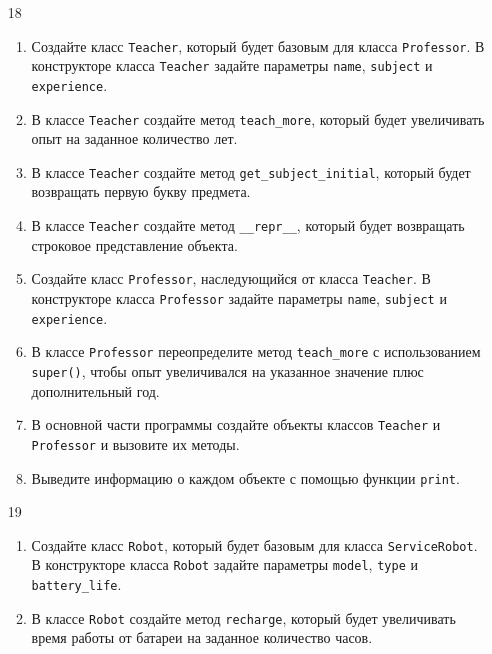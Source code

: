 \begin{enumerate}
\item[18] 
\begin{enumerate}
    \item Создайте класс \texttt{Teacher}, который будет базовым для класса \texttt{Professor}. В конструкторе класса \texttt{Teacher} задайте параметры \texttt{name}, \texttt{subject} и \texttt{experience}.
    
    \item В классе \texttt{Teacher} создайте метод \texttt{teach\_more}, который будет увеличивать опыт на заданное количество лет.
    
    \item В классе \texttt{Teacher} создайте метод \texttt{get\_subject\_initial}, который будет возвращать первую букву предмета.
    
    \item В классе \texttt{Teacher} создайте метод \texttt{\_\_repr\_\_}, который будет возвращать строковое представление объекта.
    
    \item Создайте класс \texttt{Professor}, наследующийся от класса \texttt{Teacher}. В конструкторе класса \texttt{Professor} задайте параметры \texttt{name}, \texttt{subject} и \texttt{experience}.
    
    \item В классе \texttt{Professor} переопределите метод \texttt{teach\_more} с использованием \texttt{super()}, чтобы опыт увеличивался на указанное значение плюс дополнительный год.
    
    \item В основной части программы создайте объекты классов \texttt{Teacher} и \texttt{Professor} и вызовите их методы.
    
    \item Выведите информацию о каждом объекте с помощью функции \texttt{print}.
\end{enumerate}

\item[19] 
\begin{enumerate}
    \item Создайте класс \texttt{Robot}, который будет базовым для класса \texttt{ServiceRobot}. В конструкторе класса \texttt{Robot} задайте параметры \texttt{model}, \texttt{type} и \texttt{battery\_life}.
    
    \item В классе \texttt{Robot} создайте метод \texttt{recharge}, который будет увеличивать время работы от батареи на заданное количество часов.
    

\end{enumerate}
\end{enumerate}
